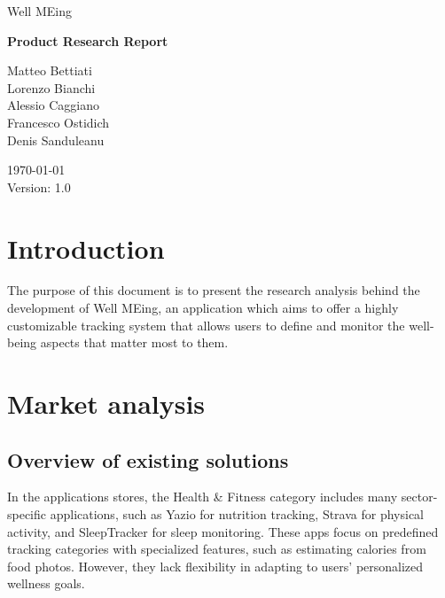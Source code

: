 \documentclass{article}
\begin{document}


\begin{center}

    \fontsize{20pt}{30pt}\selectfont
    Well MEing

    \vspace{2cm}

    \fontsize{25pt}{45pt}\selectfont
    \textbf{Product Research Report}

    \vfill

    \fontsize{12pt}{18pt}\selectfont
    Matteo Bettiati \\
    Lorenzo Bianchi \\
    Alessio Caggiano \\
    Francesco Ostidich \\
    Denis Sanduleanu \\

    \vspace{1cm}

    \today \\
    \vspace{12pt}
    Version: 1.0
    \normalsize

\end{center}

\newpage
{}
\tableofcontents
\newpage



\section{Introduction}

The purpose of this document is to present the research analysis behind the development of Well MEing, an application which aims to offer a highly customizable tracking system that allows users to define and monitor the well-being aspects that matter most to them.

\section{Market analysis}

\subsection{Overview of existing solutions}

In the applications stores, the Health \& Fitness category includes many sector-specific applications, such as Yazio for nutrition tracking, Strava for physical activity, and SleepTracker for sleep monitoring.
These apps focus on predefined tracking categories with specialized features, such as estimating calories from food photos.
However, they lack flexibility in adapting to users’ personalized wellness goals.
\end{document}
